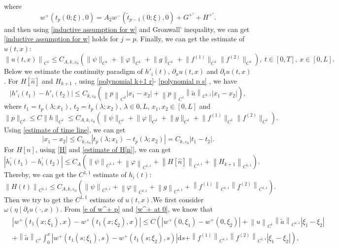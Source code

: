 \documentclass[a4paper,reqno,11pt]{amsart}
\numberwithin{equation}{section} %
\begin{document}
where
\begin{equation}\label{w^+ at t_p(t,0)}
	w^+(t_p(0 ; \xi), 0)= A_2 w^-\left(\tilde{t}_{p-1}(0 ; \xi), 0\right)+G^{+ \prime}+H^{+ \prime} .
\end{equation}
and then using \eqref{inductive assumption for w} and Gronwall' inequality, we can get \eqref{inductive assumption for w} holds for $j=p$.
Finally, we can get the estimate of $u(t,x)$:
\begin{equation}\label{estimate of u}
	\left\| u(t,x) \right\|_{C^1} \leq C_{A,k,\varepsilon _0}(\lVert \psi \rVert _{C^1}+\lVert \varphi  \rVert _{C^1}+  \lVert g \rVert _{C^1}+\lVert f^{(1)} \rVert _{C^1}\lVert f^{(2)} \rVert _{C^1}) ,\ t\in [0,T],\ x\in [0,L].
\end{equation}
Below we estimate the continuity paradigm of  $h'_i(t)$, $\partial _x u(t,x)$ and  $\partial _t u(t,x)$ .
For $ H\left[ \hat{n} \right] $ and $H_{k+1}$ , using \eqref{polynomial k+1 r}- \eqref{polynomial p s} , we have
$$
\left| h' _i\left( t_1 \right) -h'_i\left( t_2 \right) \right|\leq C_{k,\varepsilon _0}(\left\| p \right\| _{C^2}\left| x_1-x_2 \right|+\left\| p \right\| _{C^1}\left\| \tilde{a} \right\| _{C^{1,1}}\left| x_1-x_2 \right|),
$$
where $t_1=t_p(\lambda ;x _1)$, $t_2=t_p(\lambda;x _2)$, $\lambda  \in { 0,L } $, $x _1,x _2 \in [0,L]$  and
$$
\|p\|_{C^2} \leq C\|h\|_{C^1} \leq C_{A,k,\varepsilon _0}(\lVert \psi \rVert _{C^1}+\lVert \varphi  \rVert _{C^1}+  \lVert g \rVert _{C^1}+\lVert f^{(1)} \rVert _{C^1}\lVert f^{(2)} \rVert _{C^1}) .
$$
Using \eqref{estimate of time line}, we can get
$$
\left| x_1-x_2 \right|\le C_{k,\varepsilon _0}\left| t_p\left( \lambda ;x_1 \right) -t_p\left( \lambda ;x_2 \right) \right|=C_{k,\varepsilon _0}\left| t_1-t_2 \right|.
$$
For $ H\left[ n \right] $, using \eqref{H} and \eqref{estimate of H[n]}, we can get
$$
\left| h^{\prime }_i\left( t_1 \right) -h^{\prime }_i\left( t_2 \right) \right|\leq C_A(\left\| \psi \right\| _{C^{1,1}}+\left\| \varphi \right\| _{C^{1,1}}+ \left\|H\left[ \hat{n} \right] \right\| _{C^{1,1}}+\left\|H_{k+1}\right\| _{C^{1,1}}).
$$
Thereby, we can get the $C^{1,1}$ estimate of $h_i(t) $:
$$
\left\| H(t) \right\| _{C^{1,1}}\leq C_{A,k,\varepsilon _0}(\left\| \psi \right\| _{C^{1,1}}+\left\| \varphi \right\| _{C^{1,1}}+\left\| g \right\| _{C^{1,1}}+\left\| f^{(1)} \right\| _{C^{1,1}}\left\| f^{(2)} \right\| _{C^{1,1}}).
$$
Then we try to get the $C^{1,1}$ estimate of $ u(t,x)$.We first consider $\omega \left( \eta \mid \partial _tu(\cdot ,x) \right) $.
From \eqref{e of w^+ p} and \eqref{w^+ at 0}, we know that
$$
\begin{aligned}
&\left| w^+\left( t_1\left( x;\xi _1 \right) ,x \right) -w^+\left( t_1\left( x;\xi _2 \right) ,x \right) \right|  \leq C\left( \left| w^+\left( 0,\xi _1 \right) -w^+\left( 0,\xi _2 \right) \right|+\left\| u \right\| _{C^1}\left\| \tilde{a} \right\| _{C^{1,1}}\left| \xi _1-\xi _2 \right| \right. \\
&+\left\| \tilde{a} \right\| _{C^1}\int_0^x  {\left| w^+\left( t_1\left( s;\xi _1 \right),s \right) -w^+\left(t_1\left( s;\xi _2 \right),s \right) \right|\mathrm{d}s}  \left. +\left\| f^{\left( 1 \right)} \right\| _{C^{1,1}}\left\| f^{\left( 2 \right)} \right\| _{C^{1,1}}\left| \xi _1-\xi _2 \right| \right) ,
\end{aligned}
$$
\end{document}
